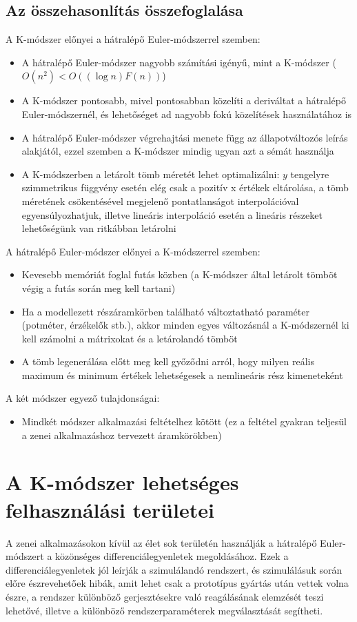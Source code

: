 \section{Az összehasonlítás összefoglalása}
A K-módszer előnyei a hátralépő Euler-módszerrel szemben:
\begin{itemize}
    \item A hátralépő Euler-módszer nagyobb számítási igényű, mint a K-módszer ($O(n^2) < O((\log{n})F(n))$)
    \item A K-módszer pontosabb, mivel pontosabban közelíti a deriváltat a hátralépő Euler-módszernél, és lehetőséget ad nagyobb fokú közelítések használatához is
    \item A hátralépő Euler-módszer végrehajtási menete függ az állapotváltozós leírás alakjától, ezzel szemben a K-módszer mindig ugyan azt a sémát használja
    \item A K-módszerben a letárolt tömb méretét lehet optimalizálni: $y$ tengelyre szimmetrikus függvény esetén elég csak a pozitív x értékek eltárolása, a tömb méretének csökentésével megjelenő pontatlanságot interpolációval egyensúlyozhatjuk, illetve lineáris interpoláció esetén a lineáris részeket lehetőségünk van ritkábban letárolni
\end{itemize}
A hátralépő Euler-módszer előnyei a K-módszerrel szemben:
\begin{itemize}
    \item Kevesebb memóriát foglal futás közben (a K-módszer által letárolt tömböt végig a futás során meg kell tartani)
    \item Ha a modellezett részáramkörben található változtatható paraméter (potméter, érzékelők stb.), akkor minden egyes változásnál a K-módszernél ki kell számolni a mátrixokat és a letárolandó tömböt
    \item A tömb legenerálása előtt meg kell győződni arról, hogy milyen reális maximum és minimum értékek lehetségesek a nemlineáris rész kimeneteként
\end{itemize}
A két módszer egyező tulajdonságai:
\begin{itemize}
    \item Mindkét módszer alkalmazási feltételhez kötött (ez a feltétel gyakran teljesül a zenei alkalmazáshoz tervezett áramkörökben)
\end{itemize}




\chapter{A K-módszer lehetséges felhasználási területei}
A zenei alkalmazásokon kívül az élet sok területén használják a hátralépő Euler-módszert a közönséges differenciálegyenletek megoldásához. Ezek a differenciálegyenletek jól leírják a szimulálandó rendszert, és szimulálásuk során előre észrevehetőek hibák, amit lehet csak a prototípus gyártás után vettek volna észre, a rendszer különböző gerjesztésekre való reagálásának elemzését teszi lehetővé, illetve a különböző rendszerparaméterek megválasztását segítheti. 

